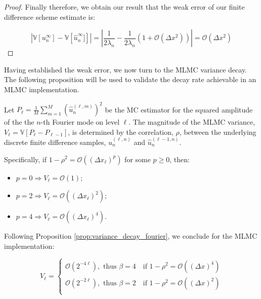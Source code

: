 \begin{proof}
Finally therefore, we obtain our result that the weak error
of our finite difference scheme estimate is:

\begin{equation*}
    |\mathbb{V}\left[u_n^\infty\right] - \mathbb{V}\left[\hat{u}_n^\infty]\right]| 
    = |\frac{1}{2\lambda_n} - \frac{1}{2 \lambda_n}\left(1 + \mathcal{O}(\Delta x^2)\right)|
    = \mathcal{O}(\Delta x^2)
\end{equation*}
\end{proof}


Having established the weak error, we now turn to the MLMC variance decay. 
The following proposition will be used to validate the decay 
rate achievable in an MLMC implementation.

\begin{proposition}
    \label{prop:variance_decay_fourier}
    Let $P_\ell = \frac{1}{M}\sum_{m=1}^M(\hat{u}_n^{(\ell,m)})^2$ 
    be the MC estimator for the squared amplitude 
    of the the $n$-th Fourier mode on level $\ell$. The magnitude of 
    the MLMC 
    variance, $V_\ell = \mathbb{V}[P_\ell - P_{\ell - 1}]$, is 
    determined by the correlation, $\rho$, between the underlying 
    discrete finite difference samples, 
    $\hat{u}_n^{(\ell, n)}$ and $\hat{u}_n^{(\ell-1, n)}$.

    Specifically, if $1 - \rho^2 = \mathcal{O}\left((\Delta x_\ell)^p\right)$ for 
    some $p \geq 0$, then:
    \begin{itemize}
        \item $p=0 \Rightarrow V_\ell=\mathcal{O}(1)$;
        \item $p=2 \Rightarrow V_\ell=\mathcal{O}((\Delta x_\ell)^2)$;
        \item $p=4 \Rightarrow V_\ell=\mathcal{O}((\Delta x_\ell)^4)$.
    \end{itemize}
\end{proposition}

Following Proposition \ref{prop:variance_decay_fourier}, we conclude for the MLMC implementation:

\begin{equation*}
    V_\ell = 
    \begin{cases}
        \mathcal{O}(2^{-4\ell}), \text{ thus } \beta = 4 \quad  \text{if } 1 - \rho^2 = \mathcal{O}\left((\Delta x)^4\right)\\
        \mathcal{O}(2^{-2\ell}), \text{ thus } \beta = 2 \quad \text{if } 1 - \rho^2 = \mathcal{O}\left((\Delta x)^2\right)\\
    \end{cases}
\end{equation*}

